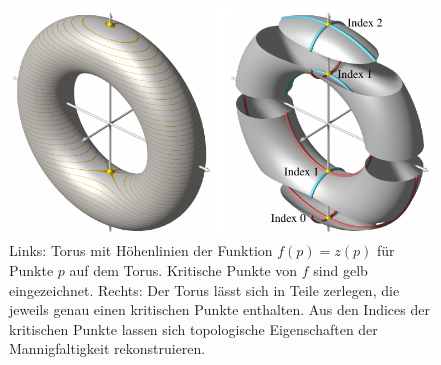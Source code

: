 %
%
%
\begin{figure}
\centering
\includegraphics{chapters/120-topologie/images/morse.pdf}
\caption{Links: Torus mit Höhenlinien der Funktion $f(p) = z(p)$ für Punkte
$p$ auf dem Torus.
Kritische Punkte von $f$ sind gelb eingezeichnet.
Rechts: Der Torus lässt sich in Teile zerlegen, die jeweils genau
einen kritischen Punkte enthalten. Aus den Indices der kritischen Punkte
lassen sich topologische Eigenschaften der Mannigfaltigkeit rekonstruieren.
\label{buch:topologie:fig:morse}}
\end{figure}
